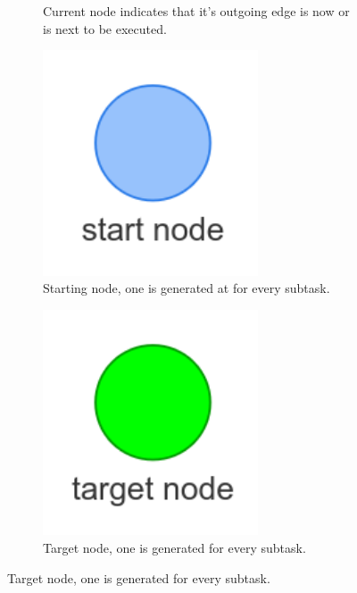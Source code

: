 \begin{figure}[H]
\begin{subfigure}{0.2\textwidth}
    \caption{Current node indicates that it's outgoing edge is now or is next to be executed.}%
    \end{subfigure}
    \begin{subfigure}{0.2\textwidth}
    \centering
    \includegraphics[width=0.7\textwidth]{figures/connecting_nodes/legend/starting_node}
    \caption{Starting node, one is generated at for every subtask.}%
    \end{subfigure}
    \begin{subfigure}{0.2\textwidth}
    \centering
    \includegraphics[width=0.7\textwidth]{figures/connecting_nodes/legend/target_node}
    \caption{Target node, one is generated for every subtask.\newline}%
    \end{subfigure}


\end{figure}
